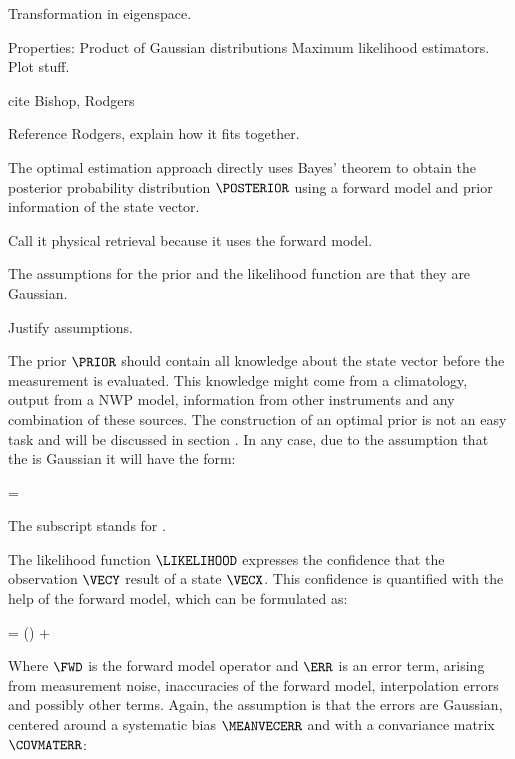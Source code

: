     Transformation in eigenspace.

    Properties: Product of Gaussian distributions Maximum likelihood
    estimators. Plot stuff.

    cite Bishop, Rodgers

\stopsection


\startsection[title=Optimal Estimation]

    Reference Rodgers, explain how it fits together.

    The optimal estimation approach directly uses Bayes' theorem
     to obtain the posterior probability distribution
    $\POSTERIOR$ using a forward model and prior information of the state
    vector.

    Call it physical retrieval because it uses the forward model.

    The assumptions for the prior {\PDF} and the likelihood function
    are that they are Gaussian.

    Justify assumptions.

    The prior $\PRIOR$ should contain all knowledge about the state vector
    before the measurement is evaluated. This knowledge might come from
    a climatology, output from a NWP model, information from other instruments
    and any combination of these sources. The construction of an optimal prior
    is not an easy task and will be discussed in section .
    In any case, due to the assumption that the {\PDF} is Gaussian it will have
    the form:

    \startformula
        \PRIOR = \GAUSS{\VECX}{\MEANVECA}{\COVMATA}
    \stopformula

    The subscript stands for .

    The likelihood function $\LIKELIHOOD$ expresses the confidence that the
    observation $\VECY$ result of a state $\VECX$. This confidence is
    quantified with the help of the forward model, which can be formulated as:

    \startformula
        \VECY = \FWD(\VECX) + \ERR
    \stopformula

    Where $\FWD$ is the forward model operator and $\ERR$ is an error term,
    arising from measurement noise, inaccuracies of the forward model,
    interpolation errors and possibly other terms. Again, the assumption is
    that the errors are Gaussian, centered around a systematic bias
    $\MEANVECERR$ and with a convariance matrix $\COVMATERR$:

